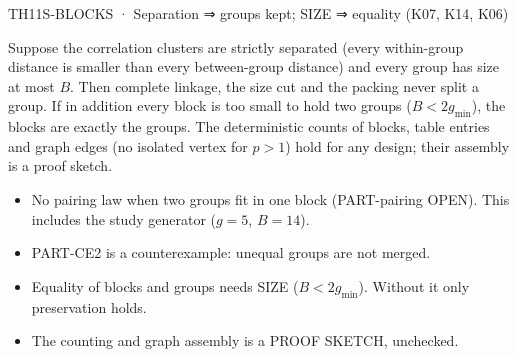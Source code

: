 \begin{card}{TH11}{S-BLOCKS · Separation ⇒ groups kept; SIZE ⇒ equality (K07, K14, K06)}
\begin{plain}
Suppose the correlation clusters are strictly separated (every within-group distance is smaller than every between-group distance) and every group has size at most $B$. Then complete linkage, the size cut and the packing never split a group. If in addition every block is too small to hold two groups ($B<2g_{\min}$), the blocks are exactly the groups. The deterministic counts of blocks, table entries and graph edges (no isolated vertex for $p>1$) hold for any design; their assembly is a proof sketch.
\end{plain}
\begin{notproved}
\begin{itemize}
\item No pairing law when two groups fit in one block (PART-pairing OPEN). This includes the study generator ($g=5$, $B=14$).
\item PART-CE2 is a counterexample: unequal groups are not merged.
\item Equality of blocks and groups needs SIZE ($B<2g_{\min}$). Without it only preservation holds.
\item The counting and graph assembly is a PROOF SKETCH, unchecked.
\end{itemize}
 
\end{notproved}
\end{card}

